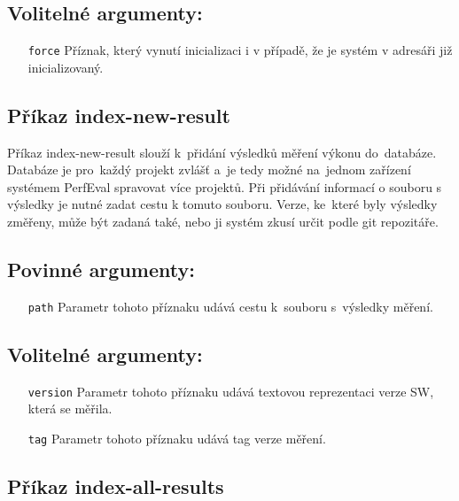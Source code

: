 \subsection*{Volitelné argumenty:}
\begin{itemize}[label=\texttt{\textbf{\textendash}}]
    \item[\texttt{force}] Příznak, který vynutí inicializaci i v případě, že je systém v adresáři již inicializovaný.
\end{itemize}

\subsection{Příkaz index-new-result}

Příkaz index-new-result slouží k~přidání výsledků měření výkonu do~databáze. Databáze
je pro~každý projekt zvlášť a~je tedy možné na~jednom zařízení systémem PerfEval spravovat více projektů.
Při přidávání informací o souboru s výsledky je nutné zadat cestu k tomuto souboru.
Verze, ke~které byly výsledky změřeny, může být zadaná také, nebo ji systém zkusí určit
podle git repozitáře.

\subsection*{Povinné argumenty:}
\begin{itemize}[label=\texttt{\textbf{\textendash}}]
    \item[\texttt{path}] Parametr tohoto příznaku udává cestu k~souboru s~výsledky měření.
\end{itemize}

\subsection*{Volitelné argumenty:}
\begin{itemize}[label=\texttt{\textbf{\textendash}}]
    \item[\texttt{version}] Parametr tohoto příznaku udává textovou reprezentaci verze SW, která se měřila.
    \item[\texttt{tag}] Parametr tohoto příznaku udává tag verze měření.
\end{itemize}

\subsection{Příkaz index-all-results}


